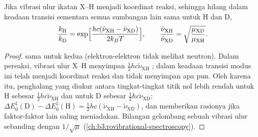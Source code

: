 \begin{proposition}\label{prop:b3:rate-theories:primary-kie}
Jika vibrasi ulur ikatan X--H menjadi koordinat reaksi, sehingga  hilang dalam keadaan transisi sementara semua sumbangan lain sama untuk
H dan D,
\[
  \frac{k_{\mathrm H}}{k_{\mathrm D}} = \exp\Bigl[\frac{hc(\tilde\nu_{\mathrm{XH}} - \tilde\nu_{\mathrm{XD}})}{2k_BT}\Bigr],
  \qquad \frac{\tilde\nu_{\mathrm{XH}}}{\tilde\nu_{\mathrm{XD}}} = \sqrt{\frac{\mu_{\mathrm{XD}}}{\mu_{\mathrm{XH}}}} .
\]
\end{proposition}

\begin{proof}
 sama untuk kedua  (elektron-elektron
tidak melihat neutron). Dalam pereaksi, vibrasi ulur X--H menyimpan
$\frac12hc\tilde\nu_{\mathrm{XH}}$ ; dalam keadaan transisi modus ini telah
menjadi koordinat reaksi dan tidak menyimpan apa pun. Oleh karena itu,
penghalang yang diukur antara tingkat-tingkat titik nol lebih rendah untuk H
sebesar $\frac12hc\tilde\nu_{\mathrm{XH}}$ dan untuk D sebesar $\frac12hc\tilde\nu_{\mathrm{XD}}$:
$\Delta E_0^{\ddagger}(\mathrm D) -
\Delta E_0^{\ddagger}(\mathrm H) = \frac12hc(\tilde\nu_{\mathrm{XH}} - \tilde\nu_{\mathrm{XD}})$, dan  memberikan rasionya jika faktor-faktor lain saling meniadakan.
Bilangan gelombang sebuah vibrasi ulur sebanding dengan $1/\sqrt\mu$
(\cref{ch:b3:rovibrational-spectroscopy}).
\end{proof}

